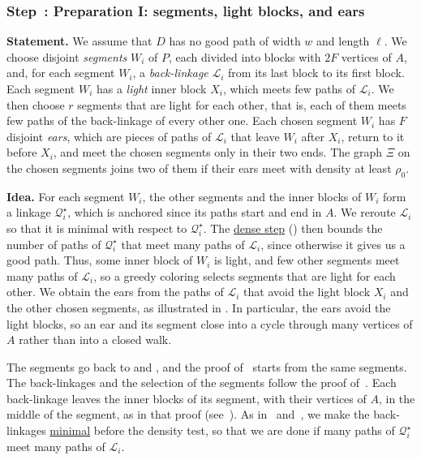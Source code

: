 \documentclass[fontsize=12pt,leading=14pt]{fullpaper}
\newcommand{\Lcal}{\mathcal{L}}
\newcommand{\Qcal}{\mathcal{Q}}
\newcounter{step}
\renewcommand{\thestep}{\arabic{step}}
\newcommand{\step}[2]{%
\subsubsection*{\refstepcounter{step}\label{step:#1}Step~\thestep: #2}}
\newcommand{\stmt}[1]{\par\noindent\textbf{Statement.} #1\par\smallskip}
\newcommand{\idea}[1]{\noindent\textbf{Idea.} #1\par}
\begin{document}
\step{prep-ears}{Preparation I: segments, light blocks, and ears}
\stmt{We assume that $D$ has no good path of width $w$ and length $\ell$.
  We choose disjoint \emph{segments} $W_i$ of $P$, each divided into blocks with $2F$ vertices of $A$, and, for each segment $W_i$, a \emph{back-linkage} $\Lcal_i$ from its last block to its first block.
  Each segment $W_i$ has a \emph{light} inner block $X_i$, which meets few paths of $\Lcal_i$.
  We then choose $r$ segments that are light for each other, that is, each of them meets few paths of the back-linkage of every other one.
  Each chosen segment $W_i$ has $F$ disjoint \emph{ears}, which are pieces of paths of $\Lcal_i$ that leave $W_i$ after $X_i$, return to it before $X_i$, and meet the chosen segments only in their two ends.
The graph $\Xi$ on the chosen segments joins two of them if their ears meet with density at least $\rho_0$.}
\idea{For each segment $W_i$, the other segments and the inner blocks of $W_i$ form a linkage $\Qcal^\star_i$, which is anchored since its paths start and end in $A$.
  We reroute $\Lcal_i$ so that it is minimal with respect to $\Qcal^\star_i$.
  The \hyperref[lem:dense-anchored]{dense step} (\zcref{step:return}) then bounds the number of paths of $\Qcal^\star_i$ that meet many paths of $\Lcal_i$, since otherwise it gives us a good path.
  Thus, some inner block of $W_i$ is light, and few other segments meet many paths of $\Lcal_i$, so a greedy coloring selects segments that are light for each other.
  We obtain the ears from the paths of $\Lcal_i$ that avoid the light block $X_i$ and the other chosen segments, as illustrated in \zcref{fig:ov-prep-ears}.
  In particular, the ears avoid the light blocks, so an ear and its segment close into a cycle through many vertices of $A$ rather than into a closed walk.

  The segments go back to \textcite[Lemma~3.2]{RW12} and \textcite[Lemma~4.6]{KawarabayashiK15}, and the proof of~\cite[Theorem~6.1]{CLNS26} starts from the same segments.
  The back-linkages and the selection of the segments follow the proof of~\cite[Lemma~4.13]{CLNS26}.
  Each back-linkage leaves the inner blocks of its segment, with their vertices of $A$, in the middle of the segment, as in that proof (see~\cite[Figure~1]{CLNS26}).
As in~\cite[Lemma~4.7]{KawarabayashiK15} and~\cite[Lemma~5.11]{HKMM26a}, we make the back-linkages \hyperref[def:minimal]{minimal} before the density test, so that we are done if many paths of $\Qcal^\star_i$ meet many paths of $\Lcal_i$.}
\end{document}
